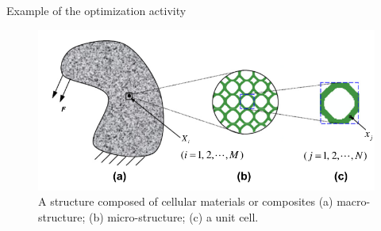 \documentclass[10pt]{beamer}
\begin{document}
\begin{frame}{Example of the optimization activity}
\begin{figure}[H]
\begin{centering}
\includegraphics[scale=0.35]{optimiTopo.png}
\par\end{centering}

\caption{\label{fig:N=2} A structure composed of cellular materials or composites (a) macro-structure; (b) micro-structure; (c) a unit cell.}

\end{figure}
\end{frame}
\end{document}
